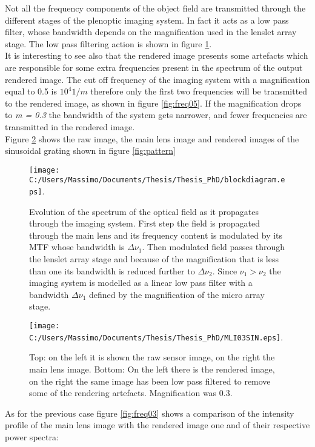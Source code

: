Not all the frequency components of the object field are transmitted through the different stages of the plenoptic imaging system. In fact it acts as a low pass filter, whose bandwidth depends on the magnification used in the lenslet array stage. The low pass filtering action is shown in figure \ref{fig:block}.
\\
  It is interesting to see also that the rendered image presents some artefacts which are responsible for some extra frequencies present in the spectrum of the output rendered image. The cut off frequency of the imaging system with a magnification equal to 0.5 is $10^4 1/m$ therefore only the first two frequencies will be transmitted to the rendered image, as shown in figure \ref{fig:freq05}.
    If the magnification drops to \textit{m = 0.3} the bandwidth of the system gets narrower, and fewer frequencies are transmitted in the rendered image.
    \\
    Figure \ref{fig:image03} shows the raw image, the main lens image and rendered images of the sinusoidal grating shown in figure \ref{fig:pattern}
  \begin{figure}[H]
  	\centering
  	\texttt{[image: C:/Users/Massimo/Documents/Thesis/Thesis\_PhD/blockdiagram.eps]}.
  	\caption{\label{fig:block} Evolution of the spectrum of the optical field as it propagates through the imaging system. First step the field is propagated through the main lens and its frequency content is modulated by its MTF whose bandwidth is $\Delta \nu_1$. Then modulated field passes through the lenslet array stage and because of the magnification that is less than one its bandwidth is reduced further to $\Delta \nu_2$. Since $\nu_1 > \nu_2$  the imaging system is modelled as a linear low pass filter with a bandwidth $\Delta \nu_1$ defined by the magnification of the micro array stage. }
  \end{figure}
 \begin{figure}[H]
 	\centering
 	\texttt{[image: C:/Users/Massimo/Documents/Thesis/Thesis\_PhD/MLI03SIN.eps]}.
 	\caption{\label{fig:image03} Top: on the left it is shown the raw sensor image, on the right the main lens image. Bottom: On the left there is the  rendered image, on the right the same image has been low pass filtered to remove some of the rendering artefacts. Magnification was 0.3. }
 \end{figure}
As for the previous case figure \ref{fig:freq03} shows a comparison of the intensity profile of the main lens image with the rendered image one and of their respective power spectra: 

